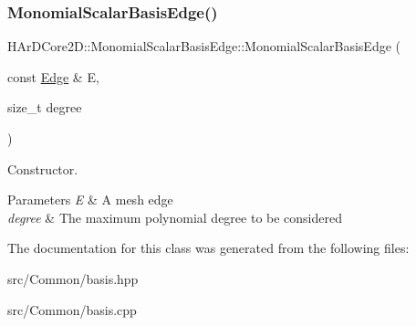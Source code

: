 \subsubsection{\texorpdfstring{Monomial\+Scalar\+Basis\+Edge()}{MonomialScalarBasisEdge()}}
{\footnotesize\ttfamily H\+Ar\+D\+Core2\+D\+::\+Monomial\+Scalar\+Basis\+Edge\+::\+Monomial\+Scalar\+Basis\+Edge (\begin{DoxyParamCaption}\item[{const \hyperlink{classHArDCore2D_1_1Edge}{Edge} \&}]{E,  }\item[{size\+\_\+t}]{degree }\end{DoxyParamCaption})}



Constructor. 


\begin{DoxyParams}{Parameters}
{\em E} & A mesh edge \\
\hline
{\em degree} & The maximum polynomial degree to be considered \\
\hline
\end{DoxyParams}


The documentation for this class was generated from the following files\+:\begin{DoxyCompactItemize}
\item 
src/\+Common/basis.\+hpp\item 
src/\+Common/basis.\+cpp\end{DoxyCompactItemize}
